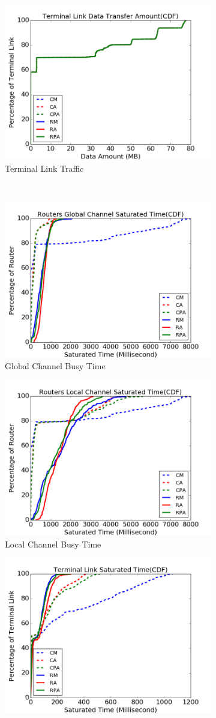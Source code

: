 \documentclass[conference,compsoc]{IEEEtran}
\begin{document}
\begin{figure}[t]
\begin{subfigure}[t]{0.32\textwidth}
        \centering
        \includegraphics[height=1.8 in]{syn-wkld/tl-traffic}
        \caption{Terminal Link Traffic}
        \label{fig:synwkld-terminal-link-traffic}
    \end{subfigure}\\

    \begin{subfigure}[t]{0.32\textwidth}
        \centering
        \includegraphics[height=1.8 in]{syn-wkld/gc-btime}
        \caption{Global Channel Busy Time}
        \label{fig:synwkld-global-channel-stime}
    \end{subfigure}\hfill
     \hspace{1em}%
    \begin{subfigure}[t]{0.32\textwidth}
        \centering
        \includegraphics[height=1.8 in]{syn-wkld/lc-btime}
        \caption{Local Channel Busy Time}
        \label{fig:synwkld-local-channel-stime}
    \end{subfigure}\hfill
    \hspace{1em}%
    \begin{subfigure}[t]{0.32\textwidth}
        \centering
        \includegraphics[height=1.8 in]{syn-wkld/tl-btime}

\end{subfigure}
\end{figure}
\end{document}
